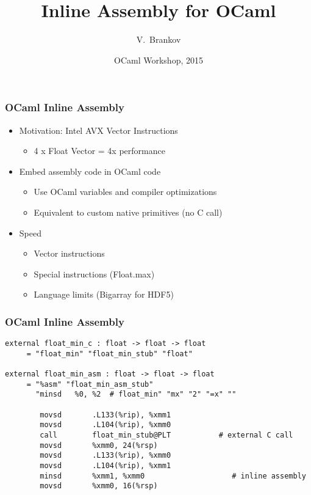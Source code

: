 \documentclass{beamer}
\title[Inline Assembly]
{Inline Assembly for OCaml}
\author[Brankov, Vladimir]{V.~Brankov\inst{1}}
\institute[Jane Street]
{
  \inst{1}
  Jane Street
}
\date[August 2015]
{OCaml Workshop, 2015}
\begin{document}
\begin{frame}
  \frametitle{OCaml Inline Assembly}
  \begin{itemize}
    \item Motivation: Intel AVX Vector Instructions
      \begin{itemize}
        \item 4 x Float Vector = 4x performance
      \end{itemize}
      \bigskip
    \item Embed assembly code in OCaml code
      \begin{itemize}
        \item Use OCaml variables and compiler optimizations
        \item Equivalent to custom native primitives (no C call)
      \end{itemize}
      \bigskip
    \item Speed
      \begin{itemize}
        \item Vector instructions
        \item Special instructions (Float.max)
        \item Language limits (Bigarray for HDF5)
      \end{itemize}
  \end{itemize}
\end{frame}
\begin{frame}[fragile]
  \frametitle{OCaml Inline Assembly}
  \begin{lstlisting}
external float_min_c : float -> float -> float
     = "float_min" "float_min_stub" "float"

external float_min_asm : float -> float -> float
     = "%asm" "float_min_asm_stub"
       "minsd	%0, %2	# float_min" "mx" "2" "=x" ""

        movsd       .L133(%rip), %xmm1
        movsd       .L104(%rip), %xmm0
        call        float_min_stub@PLT           # external C call
        movsd       %xmm0, 24(%rsp)
        movsd       .L133(%rip), %xmm0
        movsd       .L104(%rip), %xmm1
        minsd       %xmm1, %xmm0	                # inline assembly
        movsd       %xmm0, 16(%rsp)
  \end{lstlisting}
\end{frame}
\end{document}
